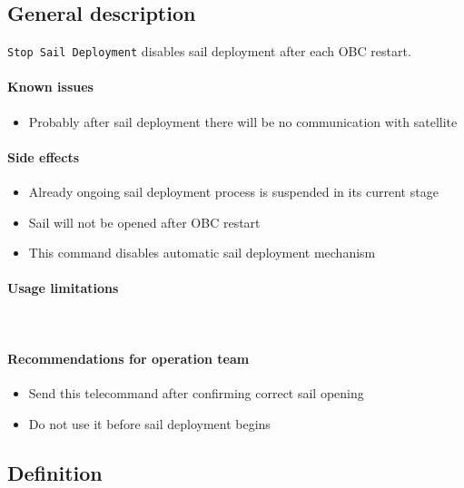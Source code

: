 

\subsection{General description}
\texttt{Stop Sail Deployment} disables sail deployment after each OBC restart. 


\paragraph{Known issues}
\begin{itemize}
	\item Probably after sail deployment there will be no communication with satellite
\end{itemize}

\paragraph{Side effects}
\begin{itemize}
	\item Already ongoing sail deployment process is suspended in its current stage
	\item Sail will not be opened after OBC restart
	\item This command disables automatic sail deployment mechanism 
\end{itemize}

\paragraph{Usage limitations}\mbox{}\\ \None

\paragraph{Recommendations for operation team}
\begin{itemize}
	\item Send this telecommand after confirming correct sail opening
	\item Do not use it before sail deployment begins 
\end{itemize}


\subsection{Definition}


